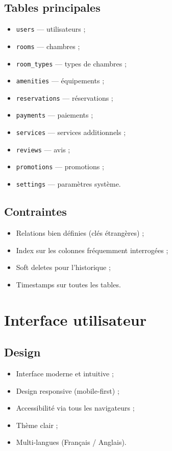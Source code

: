 \documentclass[12pt,a4paper]{report}
\begin{document}
\subsection{Tables principales}

\begin{itemize}
  \item \texttt{users} --- utilisateurs ;
  \item \texttt{rooms} --- chambres ;
  \item \texttt{room\_types} --- types de chambres ;
  \item \texttt{amenities} --- équipements ;
  \item \texttt{reservations} --- réservations ;
  \item \texttt{payments} --- paiements ;
  \item \texttt{services} --- services additionnels ;
  \item \texttt{reviews} --- avis ;
  \item \texttt{promotions} --- promotions ;
  \item \texttt{settings} --- paramètres système.
\end{itemize}

\subsection{Contraintes}

\begin{itemize}
  \item Relations bien définies (clés étrangères) ;
  \item Index sur les colonnes fréquemment interrogées ;
  \item Soft deletes pour l'historique ;
  \item Timestamps sur toutes les tables.
\end{itemize}

\section{Interface utilisateur}

\subsection{Design}

\begin{itemize}
  \item Interface moderne et intuitive ;
  \item Design responsive (mobile-first) ;
  \item Accessibilité via tous les navigateurs ;
  \item Thème clair ;
  \item Multi-langues (Français / Anglais).
\end{itemize}
\end{document}
